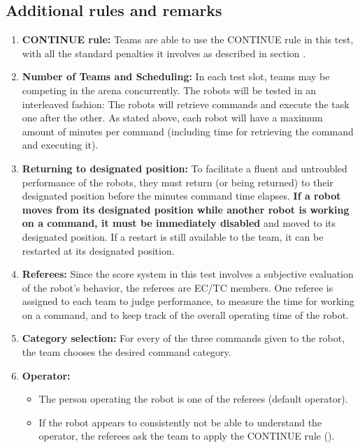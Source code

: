 \subsection{Additional rules and remarks}
\label{sec:eegpsr-remarks}
\begin{enumerate}
	\item \textbf{CONTINUE rule:} Teams are able to use the CONTINUE rule in this test, with all the standard penalties it involves as described in section .

	\item \textbf{Number of Teams and Scheduling:} In each test slot, \eegpsrTeams teams may be competing in the arena concurrently. The robots will be tested in an interleaved fashion: The robots will retrieve commands and execute the task one after the other. As stated above, each robot will have a maximum amount of \eegpsrMaxCmdTime minutes per command (including time for retrieving the command and executing it).

	\item \textbf{Returning to designated position:} To facilitate a fluent and untroubled performance of the robots, they must return (or being returned) to their designated position before the \eegpsrMaxCmdTime minutes command time elapses. \textbf{If a robot moves from its designated position while another robot is working on a command, it must be immediately disabled} and moved to its designated position. If a restart is still available to the team, it can be restarted at its designated position.

	\item \textbf{Referees:} Since the score system in this test involves a subjective evaluation of the robot's behavior, the referees are EC/TC members. One referee is assigned to each team to judge performance, to measure the time for working on a command, and to keep track of the overall operating time of the robot.

	\item \textbf{Category selection:} For every of the three commands given to the robot, the team chooses the desired command category.

	\item \textbf{Operator:}
	\begin{itemize}
		\item The person operating the robot is one of the referees (default operator).
		\item If the robot appears to consistently not be able to understand the operator, the referees ask the team to apply the CONTINUE rule ().
	\end{itemize}


\end{enumerate}
